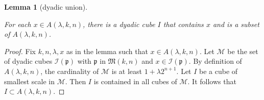 \documentclass[10pt,a4paper]{article}
\theoremstyle{plain}
\newtheorem{lemma}[theorem]{Lemma}
\theoremstyle{definition}
\numberwithin{equation}{subsection}
\newcommand{\fp}{{\mathfrak p}}
\newcommand{\scI}{{\mathcal{I}}} %
\newcommand{\lean}[1]{}
\newcommand{\leanok}{}
\begin{document}
\begin{lemma}[dyadic union]
\label{dyadic-union}
\leanok
\lean{dyadic_union}
For each $x\in A(\lambda,k,n)$,
there is a dyadic cube $I$
that contains $x$ and is
a subset of
$A(\lambda,k,n)$.
\end{lemma}

\begin{proof}
\leanok
Fix $k,n,\lambda,x$ as in the lemma such that $x\in A(\lambda,k,n)$.
Let $\mathcal{M}$ be the set of dyadic cubes $\scI(\fp)$ with $\fp$ in $\mathfrak{M}(k,n)$ and $x\in \scI(\fp)$.
By definition of $A(\lambda,k,n)$, the cardinality of $\mathcal{M}$ is at least $1+\lambda 2^{n+1}$.
Let $I$ be a cube of smallest scale in $\mathcal{M}$.
Then $I$ is contained in all cubes of $\mathcal{M}$.
It follows that $I\subset A(\lambda,k,n)$.
\end{proof}
\end{document}
